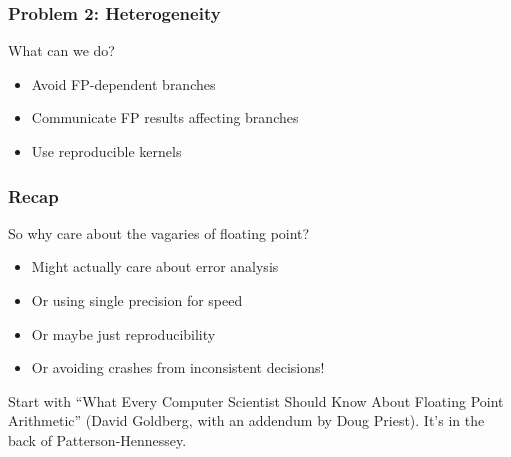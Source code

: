 \documentclass{beamer}
\begin{document}
\begin{frame}
  \frametitle{Problem 2: Heterogeneity}

  What can we do?
  \begin{itemize}
  \item Avoid FP-dependent branches
  \item Communicate FP results affecting branches
  \item Use reproducible kernels
  \end{itemize}
  
\end{frame}


\begin{frame}
  \frametitle{Recap}

  So why care about the vagaries of floating point?
  \begin{itemize}
  \item Might actually care about error analysis
  \item Or using single precision for speed
  \item Or maybe just reproducibility
  \item Or avoiding crashes from inconsistent decisions!
  \end{itemize}

  \vspace{5mm}
  Start with ``What Every Computer Scientist Should Know About Floating Point
  Arithmetic'' (David Goldberg, with an addendum by Doug Priest).  It's in
  the back of Patterson-Hennessey.

\end{frame}
\end{document}
